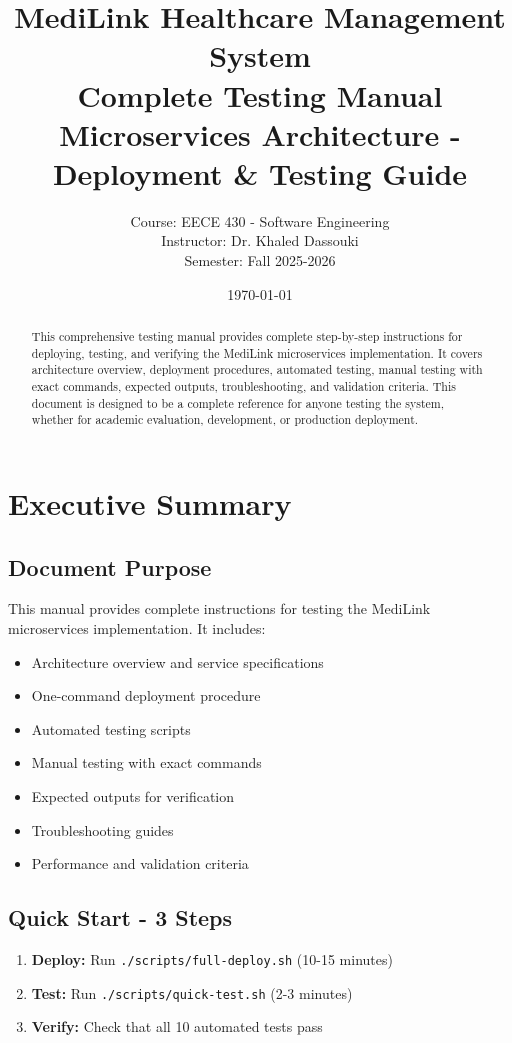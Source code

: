 \documentclass[12pt,a4paper]{article}
\title{
    \textbf{MediLink Healthcare Management System} \\
    \Large{Complete Testing Manual} \\
    \large{Microservices Architecture - Deployment \& Testing Guide}
}
\author{
    Course: EECE 430 - Software Engineering \\
    Instructor: Dr. Khaled Dassouki \\
    Semester: Fall 2025-2026
}
\date{\today}
\begin{document}
\maketitle

\begin{abstract}
This comprehensive testing manual provides complete step-by-step instructions for deploying, testing, and verifying the MediLink microservices implementation. It covers architecture overview, deployment procedures, automated testing, manual testing with exact commands, expected outputs, troubleshooting, and validation criteria. This document is designed to be a complete reference for anyone testing the system, whether for academic evaluation, development, or production deployment.
\end{abstract}

\tableofcontents
\newpage

\section{Executive Summary}

\subsection{Document Purpose}
This manual provides complete instructions for testing the MediLink microservices implementation. It includes:
\begin{itemize}
    \item Architecture overview and service specifications
    \item One-command deployment procedure
    \item Automated testing scripts
    \item Manual testing with exact commands
    \item Expected outputs for verification
    \item Troubleshooting guides
    \item Performance and validation criteria
\end{itemize}

\subsection{Quick Start - 3 Steps}
\begin{enumerate}
    \item \textbf{Deploy:} Run \texttt{./scripts/full-deploy.sh} (10-15 minutes)
    \item \textbf{Test:} Run \texttt{./scripts/quick-test.sh} (2-3 minutes)
    \item \textbf{Verify:} Check that all 10 automated tests pass
\end{enumerate}
\end{document}
